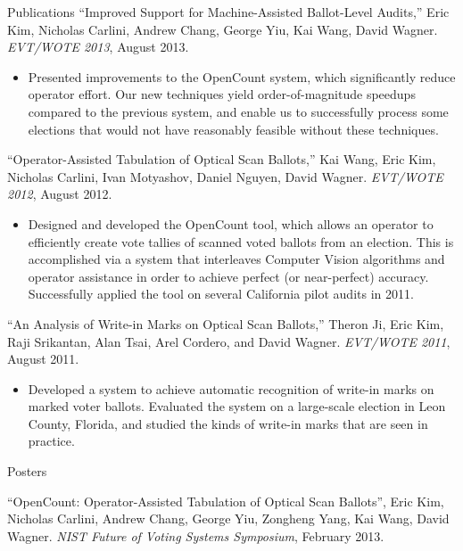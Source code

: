 \documentclass{resume}
\begin{document}
\begin{component}{Publications}
\vspace{0.5em}
``Improved Support for Machine-Assisted Ballot-Level Audits,'' Eric Kim, Nicholas Carlini, Andrew Chang, George Yiu, Kai Wang, David Wagner. \emph{EVT/WOTE 2013}, August 2013.
    \begin{itemize}
        \vspace{-0.5em}\item[] Presented improvements to the OpenCount system,
        which significantly reduce operator effort.
        Our new techniques yield order-of-magnitude speedups compared
        to the previous system, and enable us to successfully process some
        elections that would not have reasonably feasible without these
        techniques.
    \end{itemize}
    
``Operator-Assisted Tabulation of Optical Scan Ballots,'' Kai Wang, Eric Kim, Nicholas Carlini, Ivan Motyashov, Daniel Nguyen, David Wagner. \emph{EVT/WOTE 2012}, August 2012.
        \begin{itemize}
        \vspace{-0.5em}\item[] Designed and developed the OpenCount tool, which allows an operator
to efficiently create vote tallies of scanned voted ballots from an election. This is accomplished via a system 
that interleaves Computer Vision algorithms and operator assistance in order to achieve perfect (or near-perfect) accuracy.
Successfully applied the tool on several California pilot audits in 2011. 
        \end{itemize}

``An Analysis of Write-in Marks on Optical Scan Ballots,'' Theron Ji, Eric Kim, Raji Srikantan, Alan Tsai, Arel Cordero, and David Wagner. \emph{EVT/WOTE 2011}, August 2011.
	\begin{itemize}
	\vspace{-0.5em}\item[] Developed a system to achieve automatic recognition of write-in marks on marked voter ballots. Evaluated the system on
				       a large-scale election in Leon County, Florida, and studied the kinds of write-in marks that are seen in practice.
	\end{itemize}
\end{component}

\vspace{-0.5em}

\begin{component}{Posters}

``OpenCount: Operator-Assisted Tabulation of Optical Scan Ballots'', Eric Kim, Nicholas Carlini, Andrew Chang, George Yiu, Zongheng Yang, Kai Wang, David Wagner. \emph{NIST Future of Voting Systems Symposium}, February 2013. 
\end{component}
\end{document}
